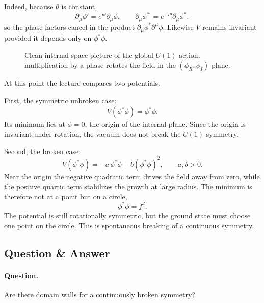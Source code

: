 Indeed, because \(\theta\) is constant,
\[
\partial_\mu\phi' = e^{i\theta}\partial_\mu\phi,
\qquad
\partial_\mu\phi^{*\prime}=e^{-i\theta}\partial_\mu\phi^*,
\]
so the phase factors cancel in the product \(\partial_\mu\phi^*\partial^\mu\phi\). Likewise \(V\) remains invariant provided it depends only on \(\phi^*\phi\).

\begin{figure}[t]
\centering
{}
\caption{Clean internal-space picture of the global \(U(1)\) action: multiplication by a phase rotates the field in the \((\phi_R,\phi_I)\)-plane.}
\label{fig:lecture07-complex-tikz}
\end{figure}

At this point the lecture compares two potentials.

First, the symmetric unbroken case:
\[
V(\phi^*\phi)=\phi^*\phi.
\]
Its minimum lies at \(\phi=0\), the origin of the internal plane. Since the origin is invariant under rotation, the vacuum does not break the \(U(1)\) symmetry.

Second, the broken case:
\begin{equation}
V(\phi^*\phi)=-a\,\phi^*\phi+b(\phi^*\phi)^2,
\qquad a,b>0.
\label{eq:mexican-hat}
\end{equation}
Near the origin the negative quadratic term drives the field away from zero, while the positive quartic term stabilizes the growth at large radius. The minimum is therefore not at a point but on a circle,
\begin{equation}
\phi^*\phi=f^2.
\label{eq:vacuum-circle}
\end{equation}
The potential is still rotationally symmetric, but the ground state must choose one point on the circle. This is spontaneous breaking of a continuous symmetry.

\subsection{Question \& Answer}

\paragraph{Question.} Are there domain walls for a continuously broken symmetry?

